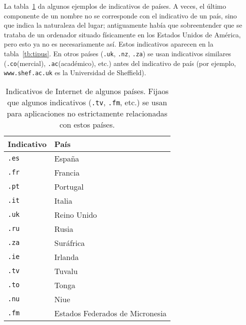 La tabla~\ref{tb:pais} da algunos ejemplos de indicativos de países. A veces, el último componente de un nombre no se corresponde con el indicativo de un país, sino que indica la naturaleza del lugar; antiguamente había que sobreentender que se trataba de un ordenador situado físicamente en los Estados Unidos de América, pero esto ya no es necesariamente así. Estos indicativos aparecen en la tabla~\ref{tb:tipus}. En otros países ({\tt .uk}, {\tt .nz}, {\tt .za}) se usan indicativos similares ({\tt .co}(mercial), {\tt .ac}(académico), etc.) antes del indicativo de país (por ejemplo, {\tt www.shef.ac.uk} es la Universidad de Sheffield). 

\begin{table} \begin{center} \begin{tabular}{l|l} \hline\hline {\sc Indicativo} &{\sc País} \\\hline {\tt .es} &España \\ {\tt .fr} &Francia \\ {\tt .pt} &Portugal \\ {\tt .it} &Italia \\ {\tt .uk} &Reino Unido \\ {\tt .ru} &Rusia \\ {\tt .za} &Suráfrica \\ {\tt .ie} &Irlanda \\ {\tt .tv} &Tuvalu \\ {\tt .to} &Tonga \\ {\tt .nu} &Niue \\ {\tt .fm} &Estados Federados de Micronesia \\ \hline

\end{tabular} \end{center} \caption{Indicativos de Internet de algunos países. Fijaos que algunos indicativos (\texttt{.tv}, \texttt{.fm}, etc.) se usan para aplicaciones no estrictamente relacionadas con estos países.} \label{tb:pais} \end{table} 

